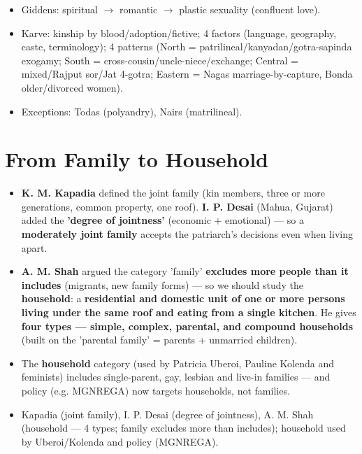 \begin{QuickRevision}
\begin{itemize}
\item Giddens: spiritual $\rightarrow$ romantic $\rightarrow$ plastic sexuality (confluent love).
\item Karve: kinship by blood/adoption/fictive; 4 factors (language, geography, caste, terminology); 4 patterns (North = patrilineal/kanyadan/gotra-sapinda exogamy; South = cross-cousin/uncle-niece/exchange; Central = mixed/Rajput sor/Jat 4-gotra; Eastern = Nagas marriage-by-capture, Bonda older/divorced women).
\item Exceptions: Todas (polyandry), Nairs (matrilineal).
\end{itemize}
\end{QuickRevision}

\section{From Family to Household}

\begin{KeyConcept}
\begin{itemize}
\item \textbf{K. M. Kapadia} defined the joint family (kin members, three or more generations, common property, one roof). \textbf{I. P. Desai} (Mahua, Gujarat) added the \textbf{'degree of jointness'} (economic + emotional) --- so a \textbf{moderately joint family} accepts the patriarch's decisions even when living apart.
\item \textbf{A. M. Shah} argued the category 'family' \textbf{excludes more people than it includes} (migrants, new family forms) --- so we should study the \textbf{household}: a \textbf{residential and domestic unit of one or more persons living under the same roof and eating from a single kitchen}. He gives \textbf{four types --- simple, complex, parental, and compound households} (built on the 'parental family' = parents + unmarried children).
\item The \textbf{household} category (used by Patricia Uberoi, Pauline Kolenda and feminists) includes single-parent, gay, lesbian and live-in families --- and policy (e.g. MGNREGA) now targets households, not families.
\end{itemize}
\end{KeyConcept}

\begin{QuickRevision}
\begin{itemize}
\item Kapadia (joint family), I. P. Desai (degree of jointness), A. M. Shah (household --- 4 types; family excludes more than includes); household used by Uberoi/Kolenda and policy (MGNREGA).
\end{itemize}
\end{QuickRevision}
